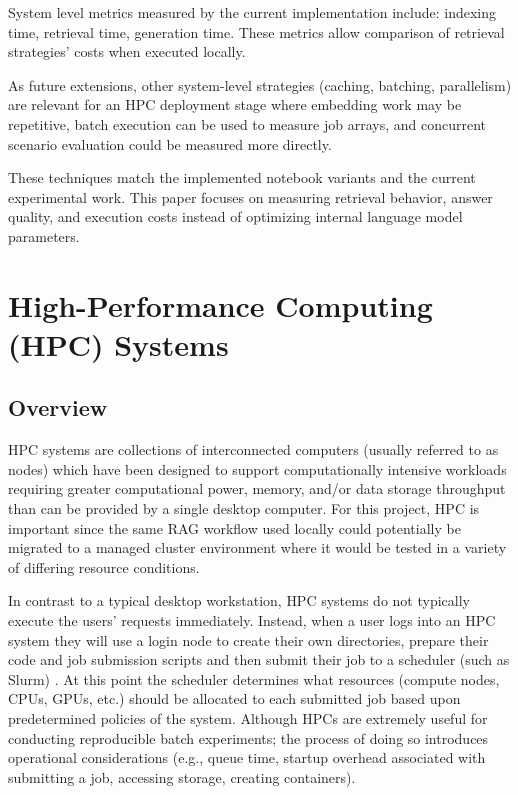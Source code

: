 System level metrics measured by the current implementation include: indexing time, retrieval time, generation time. These metrics allow comparison of retrieval strategies' costs when executed locally.

As future extensions, other system-level strategies (caching, batching, parallelism) are relevant for an \ac{HPC} deployment stage where embedding work may be repetitive, batch execution can be used to measure job arrays, and concurrent scenario evaluation could be measured more directly.

These techniques match the implemented notebook variants and the current experimental work. This paper focuses on measuring retrieval behavior, answer quality, and execution costs instead of optimizing internal language model parameters.

\section{High-Performance Computing (HPC) Systems}

\subsection{Overview}

\ac{HPC} systems are collections of interconnected computers (usually referred to as nodes) which have been designed to support computationally intensive workloads requiring greater computational power, memory, and/or data storage throughput than can be provided by a single desktop computer. For this project, \ac{HPC} is important since the same \ac{RAG} workflow used locally could potentially be migrated to a managed cluster environment where it would be tested in a variety of differing resource conditions.

In contrast to a typical desktop workstation, \ac{HPC} systems do not typically execute the users' requests immediately. Instead, when a user logs into an \ac{HPC} system they will use a login node to create their own directories, prepare their code and job submission scripts and then submit their job to a scheduler (such as Slurm) \cite{slurm2003}. At this point the scheduler determines what resources (compute nodes, \acp{CPU}, \acp{GPU}, etc.) should be allocated to each submitted job based upon predetermined policies of the system. Although \acp{HPC} are extremely useful for conducting reproducible batch experiments; the process of doing so introduces operational considerations (e.g., queue time, startup overhead associated with submitting a job, accessing storage, creating containers).

